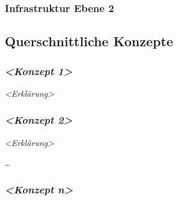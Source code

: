 \subsubsection{Infrastruktur Ebene 2}\label{_infrastruktur_ebene_2}








\subsection{Querschnittliche Konzepte}\label{section-concepts}

\subsubsection{\texorpdfstring{\emph{\textless{}Konzept
1\textgreater{}}}{\textless{}Konzept 1\textgreater{}}}\label{__emphasis_konzept_1_emphasis}

\emph{\textless{}Erklärung\textgreater{}}

\subsubsection{\texorpdfstring{\emph{\textless{}Konzept
2\textgreater{}}}{\textless{}Konzept 2\textgreater{}}}\label{__emphasis_konzept_2_emphasis}

\emph{\textless{}Erklärung\textgreater{}}

\ldots{}

\subsubsection{\texorpdfstring{\emph{\textless{}Konzept
n\textgreater{}}}{\textless{}Konzept n\textgreater{}}}\label{__emphasis_konzept_n_emphasis}

